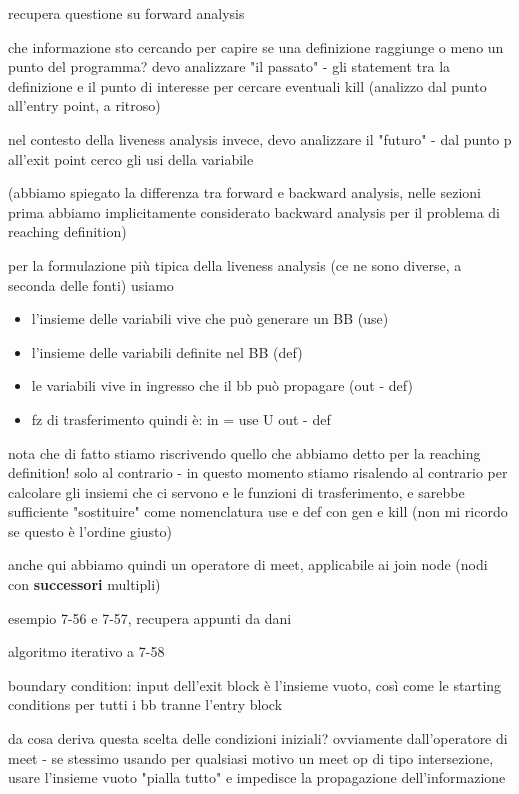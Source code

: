 recupera questione su forward analysis

che informazione sto cercando per capire se una definizione raggiunge o meno un punto del programma? devo analizzare "il passato" - gli statement tra la definizione e il punto di interesse per cercare eventuali kill (analizzo dal punto all'entry point, a ritroso)

nel contesto della liveness analysis invece, devo analizzare il "futuro" - dal punto p all'exit point cerco gli usi della variabile

(abbiamo spiegato la differenza tra forward e backward analysis, nelle sezioni prima abbiamo implicitamente considerato backward analysis per il problema di reaching definition)

per la formulazione pi\`u tipica della liveness analysis (ce ne sono diverse, a seconda delle fonti) usiamo
\begin{itemize}
  \item l'insieme delle variabili vive che pu\`o generare un BB (use)
  \item l'insieme delle variabili definite nel BB (def)
  \item le variabili vive in ingresso che il bb pu\`o propagare (out - def)
  \item fz di trasferimento quindi \`e: in = use U out - def
\end{itemize}

\begin{emphasize}
    nota che di fatto stiamo riscrivendo quello che abbiamo detto per la reaching definition! solo al contrario - in questo momento stiamo risalendo al contrario per calcolare gli insiemi che ci servono e le funzioni di trasferimento, e sarebbe sufficiente "sostituire" come nomenclatura use e def con gen e kill (non mi ricordo se questo \`e l'ordine giusto)
\end{emphasize}

anche qui abbiamo quindi un operatore di meet, applicabile ai join node (nodi con \textbf{successori} multipli)

esempio 7-56 e 7-57, recupera appunti da dani

algoritmo iterativo a 7-58

boundary condition: input dell'exit block \`e l'insieme vuoto, cos\`i come le starting conditions per tutti i bb tranne l'entry block

da cosa deriva questa scelta delle condizioni iniziali? ovviamente dall'operatore di meet - se stessimo usando per qualsiasi motivo un meet op di tipo intersezione, usare l'insieme vuoto "pialla tutto" e impedisce la propagazione dell'informazione

